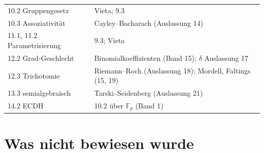\begin{merksatz}
\begin{center}
{\begin{tabular}{@{}P{3.4cm}P{5.2cm}@{}}
10.2 Gruppengesetz & Vieta; 9.3\\
10.3 Assoziativität & Cayley--Bacharach (Auslassung 14)\\
11.1, 11.2 Parametrisierung & 9.3; Vieta\\
12.2 Grad-Geschlecht & Binomialkoeffizienten (Band 15); $\delta$ Auslassung 17\\
12.3 Trichotomie & Riemann--Roch (Auslassung 18); Mordell, Faltings (15, 19)\\
13.3 semialgebraisch & Tarski--Seidenberg (Auslassung 21)\\
14.2 ECDH & 10.2 über $\mathbb F_p$ (Band 1)\\
\bottomrule
\end{tabular}}
\end{center}
\end{merksatz}

\section{Was nicht bewiesen wurde}

